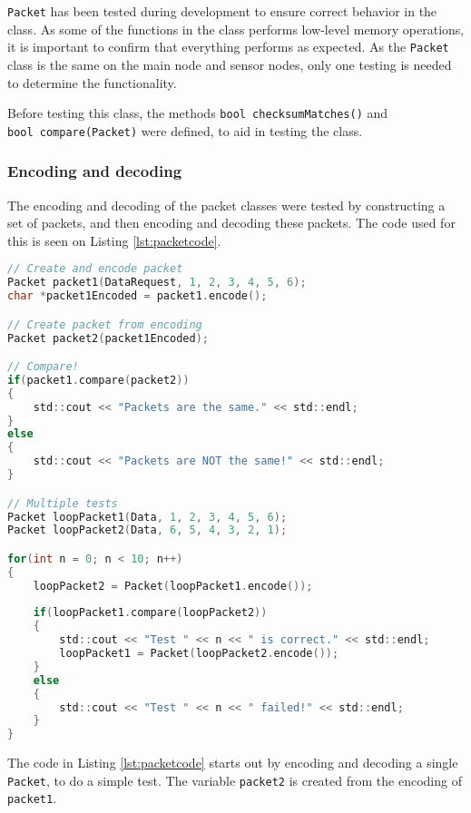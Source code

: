 \texttt{Packet} has been tested during development to ensure correct behavior in the class. As some of the functions in the class performs low-level memory operations, it is important to confirm that everything performs as expected. As the \texttt{Packet} class is the same on the main node and sensor nodes, only one testing is needed to determine the functionality.

Before testing this class, the methods \texttt{bool checksumMatches()} and \\ \texttt{bool compare(Packet)} were defined, to aid in testing the class.

\subsubsection*{Encoding and decoding}
The encoding and decoding of the packet classes were tested by constructing a set of packets, and then encoding and decoding these packets. The code used for this is seen on Listing \ref{lst:packetcode}.

\begin{lstlisting}[language=C,label={lst:packetcode},caption={Testing packet encoding/decoding.}]
// Create and encode packet
Packet packet1(DataRequest, 1, 2, 3, 4, 5, 6);
char *packet1Encoded = packet1.encode();

// Create packet from encoding
Packet packet2(packet1Encoded);

// Compare!
if(packet1.compare(packet2))
{
    std::cout << "Packets are the same." << std::endl;
}
else
{
    std::cout << "Packets are NOT the same!" << std::endl;
}

// Multiple tests
Packet loopPacket1(Data, 1, 2, 3, 4, 5, 6);
Packet loopPacket2(Data, 6, 5, 4, 3, 2, 1);

for(int n = 0; n < 10; n++)
{
    loopPacket2 = Packet(loopPacket1.encode());
    
    if(loopPacket1.compare(loopPacket2))
    {
        std::cout << "Test " << n << " is correct." << std::endl;
        loopPacket1 = Packet(loopPacket2.encode());
    }
    else
    {
        std::cout << "Test " << n << " failed!" << std::endl;
    }
}
\end{lstlisting}
The code in Listing \ref{lst:packetcode} starts out by encoding and decoding a single \texttt{Packet}, to do a simple test. The variable \texttt{packet2} is created from the encoding of \texttt{packet1}. 

